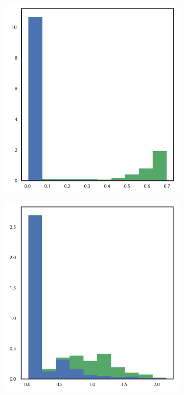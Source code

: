 \begin{figure}[h!]
\begin{subfigure}[t]{0.15\textwidth}
\label{fig:lorenz_real}
\end{subfigure}
    \begin{subfigure}[t]{0.15\textwidth}
\centering
\includegraphics[scale=0.22]{lorenz/attractor_assignment.pdf}
\label{fig:lorenz_assignment}
\end{subfigure}
    \begin{subfigure}[t]{0.15\textwidth}
\centering
\includegraphics[scale=0.22]{lorenz/SOM_VAE.pdf}

\end{subfigure}
\end{figure}
